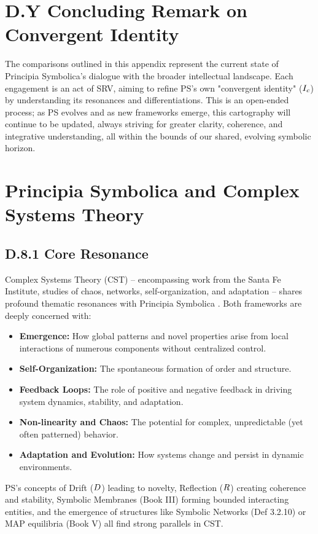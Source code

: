 \section*{D.Y Concluding Remark on Convergent Identity} \label{sec:appD_concluding_remark_convergent_identity}
The comparisons outlined in this appendix represent the current state of Principia Symbolica's dialogue with the broader intellectual landscape. Each engagement is an act of SRV, aiming to refine PS's own "convergent identity" (\(I_c\)) by understanding its resonances and differentiations. This is an open-ended process; as PS evolves and as new frameworks emerge, this cartography will continue to be updated, always striving for greater clarity, coherence, and integrative understanding, all within the bounds of our shared, evolving symbolic horizon.
\section*{Principia Symbolica and Complex Systems Theory} \label{sec:appD_ps_and_complex_systems_theory}
\subsection*{D.8.1 Core Resonance}
\label{subsec:appD_cst_core_resonance}
Complex Systems Theory (CST) – encompassing work from the Santa Fe Institute, studies of chaos, networks, self-organization, and adaptation – shares profound thematic resonances with Principia Symbolica \cite{mitchell2009}. Both frameworks are deeply concerned with:
\begin{itemize}
    \item \textbf{Emergence:} How global patterns and novel properties arise from local interactions of numerous components without centralized control.
    \item \textbf{Self-Organization:} The spontaneous formation of order and structure.
    \item \textbf{Feedback Loops:} The role of positive and negative feedback in driving system dynamics, stability, and adaptation.
    \item \textbf{Non-linearity and Chaos:} The potential for complex, unpredictable (yet often patterned) behavior.
    \item \textbf{Adaptation and Evolution:} How systems change and persist in dynamic environments.
\end{itemize}
PS's concepts of Drift (\(D\)) leading to novelty, Reflection (\(R\)) creating coherence and stability, Symbolic Membranes (Book III) forming bounded interacting entities, and the emergence of structures like Symbolic Networks (Def 3.2.10) or MAP equilibria (Book V) all find strong parallels in CST.
